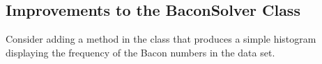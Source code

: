 \subsection*{Improvements to the BaconSolver Class} %

Consider adding a  method in the  class that produces a simple histogram displaying the frequency of the Bacon numbers in the data set.


